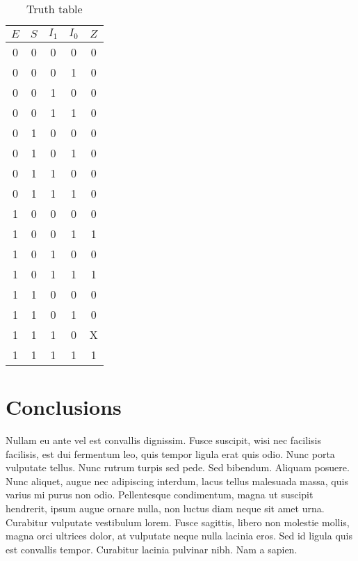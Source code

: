 \documentclass{article}
\begin{document}
\begin{table}[h]
  \label{tab:table_01}
  \centering
  \begin{tabular}{cccc|c}
    $E$ & $S$ & $I_1$ & $I_0$ & $Z$ \\
    \hline
    0 & 0 & 0 & 0 & 0 \\
    0 & 0 & 0 & 1 & 0 \\
    0 & 0 & 1 & 0 & 0 \\
    0 & 0 & 1 & 1 & 0 \\
    0 & 1 & 0 & 0 & 0 \\
    0 & 1 & 0 & 1 & 0 \\
    0 & 1 & 1 & 0 & 0 \\
    0 & 1 & 1 & 1 & 0 \\
    1 & 0 & 0 & 0 & 0 \\
    1 & 0 & 0 & 1 & 1 \\
    1 & 0 & 1 & 0 & 0 \\
    1 & 0 & 1 & 1 & 1 \\
    1 & 1 & 0 & 0 & 0 \\
    1 & 1 & 0 & 1 & 0 \\
    1 & 1 & 1 & 0 & X \\
    1 & 1 & 1 & 1 & 1 \\
  \end{tabular}
  \caption{Truth table}
\end{table}


\section{Conclusions}
\label{sec:conclusion}

Nullam eu ante vel est convallis dignissim. Fusce suscipit, wisi nec
facilisis facilisis, est dui fermentum leo, quis tempor ligula erat
quis odio. Nunc porta vulputate tellus. Nunc rutrum turpis sed
pede. Sed bibendum. Aliquam posuere. Nunc aliquet, augue nec
adipiscing interdum, lacus tellus malesuada massa, quis varius mi
purus non odio. Pellentesque condimentum, magna ut suscipit hendrerit,
ipsum augue ornare nulla, non luctus diam neque sit amet
urna. Curabitur vulputate vestibulum lorem. Fusce sagittis, libero non
molestie mollis, magna orci ultrices dolor, at vulputate neque nulla
lacinia eros. Sed id ligula quis est convallis tempor. Curabitur
lacinia pulvinar nibh. Nam a sapien.
\end{document}
